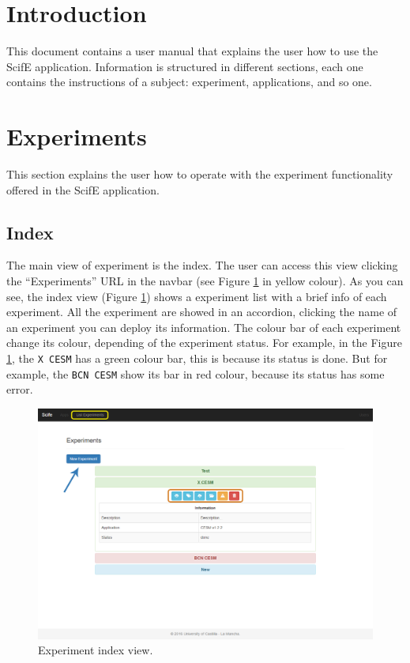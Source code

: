 \documentclass[11pt]{article}
\begin{document}
\newpage
\thispagestyle{empty}
\tableofcontents
\clearpage
\thispagestyle{empty}
\listoffigures
\clearpage
\setcounter{page}{1}

\section{Introduction}
This document contains a user manual that explains the user how to use the ScifE application. Information is structured in different sections, each one contains the instructions of a subject: experiment, applications, and so one.

\section{Experiments}
This section explains the user how to operate with the experiment functionality offered in the ScifE application.

\subsection{Index}
The main view of experiment is the index. The user can access this view clicking the ``Experiments'' URL in the navbar (see Figure \ref{fig:index} in yellow colour). As you can see, the index view (Figure \ref{fig:index}) shows a experiment list with a brief info of each experiment. All the experiment are showed in an accordion, clicking the name of an experiment you can deploy its information. The colour bar of each experiment change its colour, depending of the experiment status. For example, in the Figure \ref{fig:index}, the \texttt{X CESM} has a green colour bar, this is because its status is done. But for example, the \texttt{BCN CESM} show its bar in red colour, because its status has some error.\\
\begin{figure}[htp]
	\centering
	\includegraphics[width=\linewidth]{index}
	\caption{Experiment index view.}
	\label{fig:index}
\end{figure}
\end{document}
